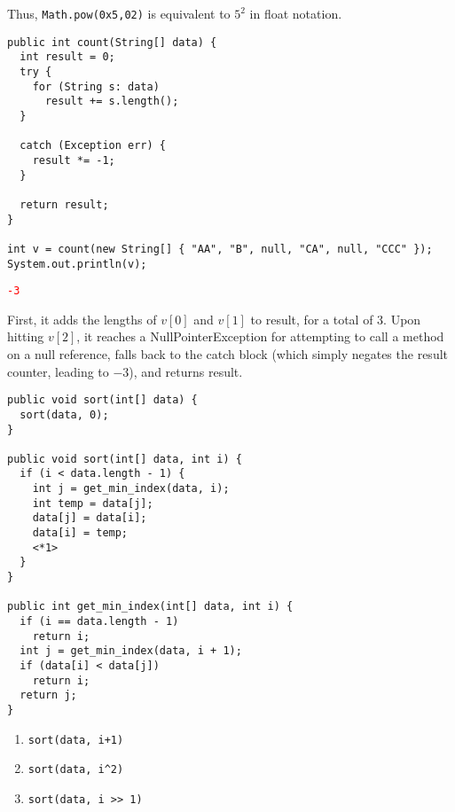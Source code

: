 \documentclass[11pt,addpoints]{exam}
\begin{document}
\begin{questions}
Thus, {\tt Math.pow(0x5,02)} is equivalent to $5^{2}$ in float notation.

\begin{minipage}{\textwidth}

\begin{verbatim}
public int count(String[] data) {
  int result = 0;
  try {
    for (String s: data)
      result += s.length();
  }

  catch (Exception err) {
    result *= -1;
  }

  return result;
}

int v = count(new String[] { "AA", "B", null, "CA", null, "CCC" });
System.out.println(v);

\end{verbatim}

\begin{choices}
  \choice \textcolor{red}{\tt -3}
   \\
\end{choices}
\end{minipage}

First, it adds the lengths of $v[0]$ and $v[1]$ to result, for a total of 3. Upon hitting $v[2]$, it reaches a NullPointerException for attempting to call a method on a null reference, falls back to the catch block (which simply negates the result counter, leading to $-3$), and returns result.

\begin{minipage}{\textwidth}


\begin{verbatim}
public void sort(int[] data) {
  sort(data, 0);
}

public void sort(int[] data, int i) {
  if (i < data.length - 1) {
    int j = get_min_index(data, i);
    int temp = data[j];
    data[j] = data[i];
    data[i] = temp;
    <*1>
  }
}

public int get_min_index(int[] data, int i) {
  if (i == data.length - 1)
    return i;
  int j = get_min_index(data, i + 1);
  if (data[i] < data[j])
    return i;
  return j;
}
\end{verbatim}

\begin{enumerate}[label=\Roman*.]
  \item {\tt sort(data, i+1)}
  \item {\tt sort(data, i\textasciicircum2)}
  \item {\tt sort(data, i >> 1)} \\
\end{enumerate}


\end{minipage}
\end{questions}
\end{document}
